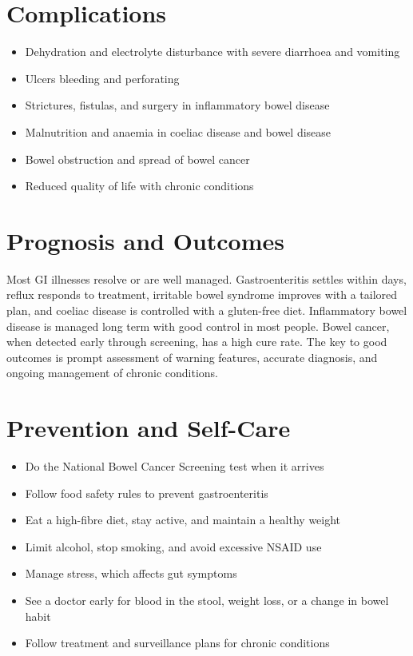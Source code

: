 \section*{Complications}
\begin{itemize}
    \item Dehydration and electrolyte disturbance with severe diarrhoea and vomiting
    \item Ulcers bleeding and perforating
    \item Strictures, fistulas, and surgery in inflammatory bowel disease
    \item Malnutrition and anaemia in coeliac disease and bowel disease
    \item Bowel obstruction and spread of bowel cancer
    \item Reduced quality of life with chronic conditions
\end{itemize}

\section*{Prognosis and Outcomes}
Most GI illnesses resolve or are well managed. Gastroenteritis settles within days, reflux responds to treatment, irritable bowel syndrome improves with a tailored plan, and coeliac disease is controlled with a gluten-free diet. Inflammatory bowel disease is managed long term with good control in most people. Bowel cancer, when detected early through screening, has a high cure rate. The key to good outcomes is prompt assessment of warning features, accurate diagnosis, and ongoing management of chronic conditions.

\section*{Prevention and Self-Care}
\begin{itemize}
    \item Do the National Bowel Cancer Screening test when it arrives
    \item Follow food safety rules to prevent gastroenteritis
    \item Eat a high-fibre diet, stay active, and maintain a healthy weight
    \item Limit alcohol, stop smoking, and avoid excessive NSAID use
    \item Manage stress, which affects gut symptoms
    \item See a doctor early for blood in the stool, weight loss, or a change in bowel habit
    \item Follow treatment and surveillance plans for chronic conditions
\end{itemize}

